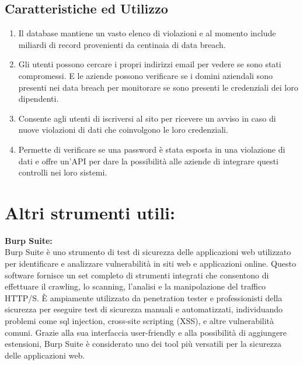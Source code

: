 \subsection{Caratteristiche ed Utilizzo}\label{subsec:es_subsec_tool5}

\begin{enumerate}
    \item Il database mantiene un vasto elenco di violazioni e al momento include miliardi di record provenienti da centinaia di data breach.
    \item Gli utenti possono cercare i propri indirizzi email per vedere se sono stati compromessi. E le aziende possono verificare se i domini aziendali sono presenti nei data breach per monitorare se sono presenti le credenziali dei loro dipendenti.
    \item Consente agli utenti di iscriversi al sito per ricevere un avviso in caso di nuove violazioni di dati che coinvolgono le loro credenziali.
    \item Permette di verificare se una password è stata esposta in una violazione di dati e offre un'API per dare la possibilità alle aziende di integrare questi controlli nei loro sistemi.\\
\end{enumerate}

\section{Altri strumenti utili:}\label{sec:cap_sec_tool6}

\textbf{Burp Suite:}\\
Burp Suite è uno strumento di test di sicurezza delle applicazioni web utilizzato per identificare e analizzare vulnerabilità in siti web e applicazioni online. Questo software fornisce un set completo di strumenti integrati che consentono di effettuare il crawling, lo scanning, l'analisi e la manipolazione del traffico HTTP/S. È ampiamente utilizzato da penetration tester e professionisti della sicurezza per eseguire test di sicurezza manuali e automatizzati, individuando problemi come sql injection, cross-site scripting (XSS), e altre vulnerabilità comuni. Grazie alla sua interfaccia user-friendly e alla possibilità di aggiungere estensioni, Burp Suite è considerato uno dei tool più versatili per la sicurezza delle applicazioni web.\\


